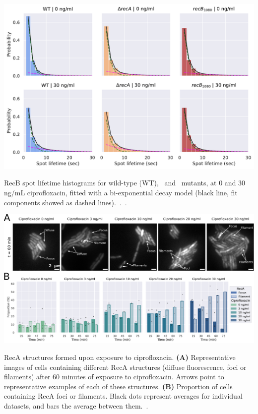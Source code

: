 \begin{suppfigure*}[htbp]
    \begin{center}
        \includegraphics[width=.8\textwidth]{SI_Figures/Mutants_RecB_fits.pdf}
    \end{center}
    \caption{RecB spot lifetime histograms for wild-type (WT), \dreca\ and \geneteneighty\ mutants, at 0 and 30 ng/mL ciprofloxacin, fitted with a bi-exponential decay model (black line, fit components showed as dashed lines).\ .\ .}\label{SIFig:mutants_biexp_fits}
\end{suppfigure*}

\begin{suppfigure*}[htbp]
    \begin{center}
    \includegraphics[width=\textwidth]{SI_Figures/RecA_structures.pdf}
    \end{center}
    \caption{RecA structures formed upon exposure to ciprofloxacin. \textbf{(A)} Representative images of cells containing different RecA structures (diffuse fluorescence, foci or filaments) after 60 minutes of exposure to ciprofloxacin. Arrows point to representative examples of each of these structures. \textbf{(B)} Proportion of cells containing RecA foci or filaments. Black dots represent averages for individual datasets, and bars the average between them.\ .}\label{SIFig:reca_structures}
\end{suppfigure*}

